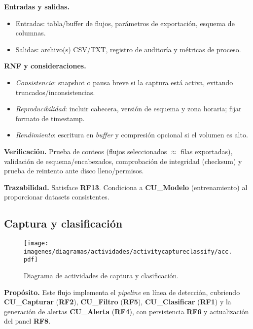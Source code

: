 \textbf{Entradas y salidas.}
\begin{itemize}
  \item Entradas: tabla/buffer de flujos, parámetros de exportación, esquema de columnas.
  \item Salidas: archivo(s) CSV/TXT, registro de auditoría y métricas de proceso.
\end{itemize}

\textbf{RNF y consideraciones.}
\begin{itemize}
  \item \emph{Consistencia}: snapshot o pausa breve si la captura está activa, evitando truncados/inconsistencias.
  \item \emph{Reproducibilidad}: incluir cabecera, versión de esquema y zona horaria; fijar formato de timestamp.
  \item \emph{Rendimiento}: escritura en \emph{buffer} y compresión opcional si el volumen es alto.
\end{itemize}

\textbf{Verificación.} Prueba de conteos (flujos seleccionados $\approx$ filas exportadas), validación de esquema/encabezados, comprobación de integridad (checksum) y prueba de reintento ante disco lleno/permisos.

\textbf{Trazabilidad.} Satisface \textbf{RF13}. Condiciona a \textbf{CU\_Modelo} (entrenamiento) al proporcionar datasets consistentes.

\subsection{Captura y clasificación}

\begin{figure}[H] \centering \texttt{[image: imagenes/diagramas/actividades/activitycaptureclassify/acc.pdf]} \caption{Diagrama de actividades de captura y clasificación.} \label{fig:diagActCyC} \end{figure}

\textbf{Propósito.} Este flujo implementa el \emph{pipeline} en línea de detección, cubriendo \textbf{CU\_Capturar} (\textbf{RF2}), \textbf{CU\_Filtro} (\textbf{RF5}), \textbf{CU\_Clasificar} (\textbf{RF1}) y la generación de alertas \textbf{CU\_Alerta} (\textbf{RF4}), con persistencia \textbf{RF6} y actualización del panel \textbf{RF8}.

